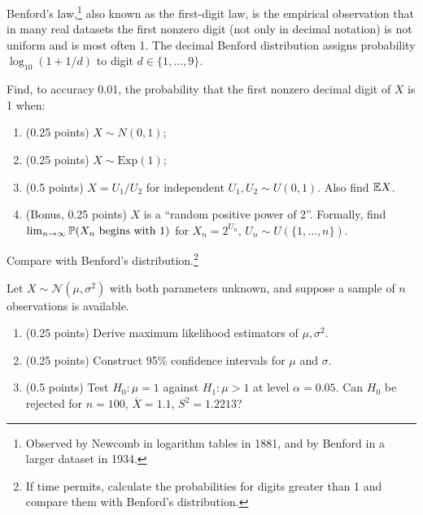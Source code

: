 \documentclass[a4paper]{report}
\begin{document}
\begin{problem}
Benford's law,\footnote{Observed by Newcomb in logarithm tables in 1881, and by Benford in a larger dataset in 1934.} also known as the first-digit law, is the empirical observation that in many real datasets the first nonzero digit (not only in decimal notation) is not uniform and is most often 1. The decimal Benford distribution assigns probability $\log_{10}(1+1/d)$ to digit $d\in\{1,\ldots,9\}$.

Find, to accuracy 0.01, the probability that the first nonzero decimal digit of $X$ is 1 when:
\begin{enumerate}
\item (0.25 points) $X\sim N(0,1)$;
\item (0.25 points) $X\sim\mathrm{Exp}(1)$;
\item (0.5 points) $X=U_1/U_2$ for independent $U_1,U_2\sim U(0,1)$. Also find $\E X$.
\item (Bonus, 0.25 points) $X$ is a ``random positive power of 2''. Formally, find $\lim_{n\to\infty}\P(X_n\text{ begins with }1)$ for $X_n=2^{U_n}$, $U_n\sim U(\{1,\ldots,n\})$.
\end{enumerate}
Compare with Benford's distribution.\footnote{If time permits, calculate the probabilities for digits greater than 1 and compare them with Benford's distribution.}
\end{problem}
\begin{problem}
Let $X\sim\mathcal N(\mu,\sigma^2)$ with both parameters unknown, and suppose a sample of $n$ observations is available.
\begin{enumerate}
\item (0.25 points) Derive maximum likelihood estimators of $\mu,\sigma^2$.
\item (0.25 points) Construct 95\% confidence intervals for $\mu$ and $\sigma$.
\item (0.5 points) Test $H_0:\mu=1$ against $H_1:\mu>1$ at level $\alpha=0.05$. Can $H_0$ be rejected for $n=100$, $\overline X=1.1$, $S^2=1.2213$?
\end{enumerate}
\end{problem}
\end{document}
